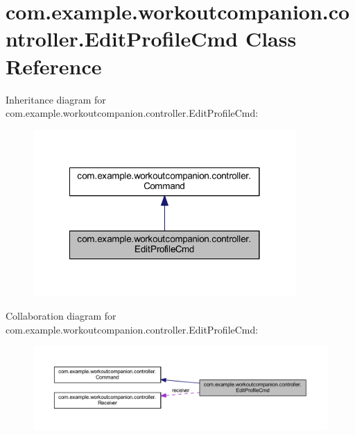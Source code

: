 \hypertarget{classcom_1_1example_1_1workoutcompanion_1_1controller_1_1_edit_profile_cmd}{\section{com.\-example.\-workoutcompanion.\-controller.\-Edit\-Profile\-Cmd Class Reference}
\label{classcom_1_1example_1_1workoutcompanion_1_1controller_1_1_edit_profile_cmd}
}


Inheritance diagram for com.\-example.\-workoutcompanion.\-controller.\-Edit\-Profile\-Cmd\-:
\nopagebreak
\begin{figure}[H]
\begin{center}
\leavevmode
\includegraphics[width=284pt]{classcom_1_1example_1_1workoutcompanion_1_1controller_1_1_edit_profile_cmd__inherit__graph}
\end{center}
\end{figure}


Collaboration diagram for com.\-example.\-workoutcompanion.\-controller.\-Edit\-Profile\-Cmd\-:
\nopagebreak
\begin{figure}[H]
\begin{center}
\leavevmode
\includegraphics[width=350pt]{classcom_1_1example_1_1workoutcompanion_1_1controller_1_1_edit_profile_cmd__coll__graph}
\end{center}
\end{figure}
